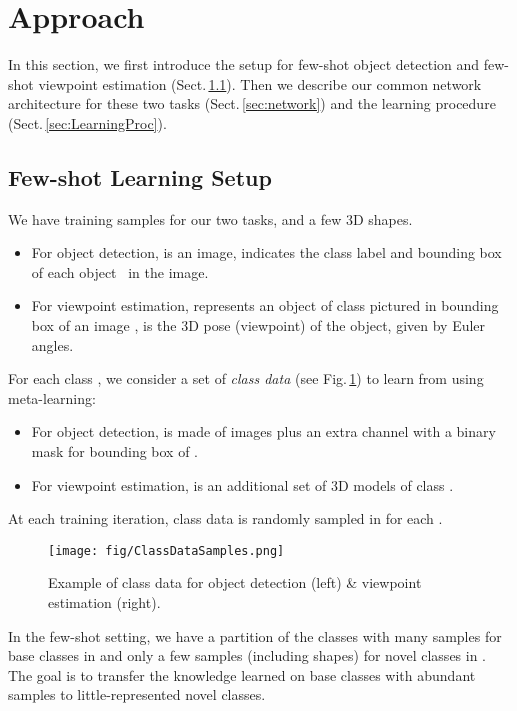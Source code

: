 \documentclass[runningheads]{llncs}
\begin{document}
\section{Approach}

In this section, we first introduce the setup for few-shot object detection and few-shot viewpoint estimation (Sect.\,\ref{sec:fsSetup}).
Then we describe our common network architecture for these two tasks (Sect.\,\ref{sec:network}) and the learning procedure (Sect.\,\ref{sec:LearningProc}).


\subsection{Few-shot Learning Setup}
\label{sec:fsSetup}

We have training samples  for our two tasks, and a few 3D shapes.
\begin{itemize}[topsep=1pt,itemsep=1pt]
    \item For object detection,  is an image,  indicates the class label  and bounding box  of each object~ in the image. \item For viewpoint estimation,  represents an object of class  pictured in bounding box  of an image ,  is the 3D pose (viewpoint) of the object, given by Euler angles. \end{itemize}
For each class , we consider a set  of \emph{class data} (see Fig.\,\ref{fig:ClassData}) to learn from using meta-learning:
\begin{itemize}[topsep=1pt,itemsep=1pt]
    \item For object detection,  is made of images  plus an extra channel with a binary mask for bounding box  of . \item For viewpoint estimation,  is an additional set of 3D models of class .
\end{itemize}    
At each training iteration, class data  is randomly sampled in  for each . 


\begin{figure}[t]
\centering
\texttt{[image: fig/ClassDataSamples.png]} \\
\caption{Example of class data for object detection (left) \& viewpoint estimation (right).}
\label{fig:ClassData}
\end{figure}



In the few-shot setting, we have a partition of the classes  with many samples for base classes in  and only a few samples (including shapes) for novel classes in .  The goal is to transfer the knowledge learned on base classes with abundant samples to little-represented novel classes.
\end{document}
